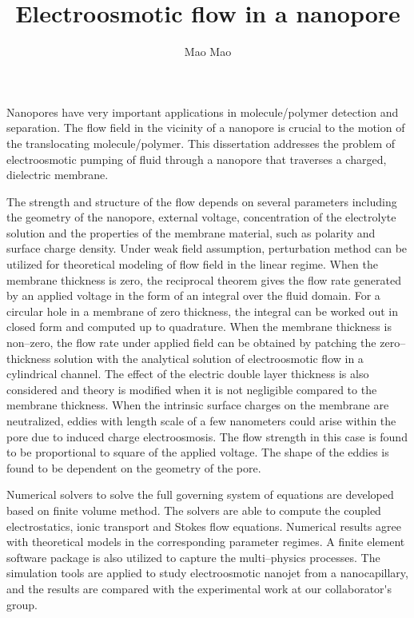 \documentclass[12pt]{nuthesis}	%
\author{Mao Mao}
\title{Electroosmotic flow in a nanopore}
\begin{document}
%	
%


\frontmatter		%

\maketitle		%

\copyrightpage		%

\abstract		%
Nanopores have very important applications in molecule\//polymer detection and separation. The flow field in the vicinity of a nanopore is crucial to the motion of the translocating molecule\//polymer. This dissertation addresses the problem of electroosmotic pumping of fluid through a nanopore that traverses a charged, dielectric membrane. 

The strength and structure of the flow depends on several parameters including the geometry of the nanopore, external voltage, concentration of the electrolyte solution and the properties of the membrane material, such as polarity and surface charge density. Under weak field assumption, perturbation method can be utilized for theoretical modeling of flow field in the linear regime. When the membrane thickness is zero, the reciprocal theorem gives the flow rate generated by an applied voltage in the form of an integral over the fluid domain. For a circular hole in a membrane of zero thickness, the integral can be worked out in closed form and computed up to quadrature. When the membrane thickness is non--zero, the flow rate under applied field can be obtained by patching the zero--thickness solution with the analytical solution of electroosmotic flow in a cylindrical channel. The effect of the electric double layer thickness is also considered and theory is modified when it is not negligible compared to the membrane thickness. When the intrinsic surface charges on the membrane are neutralized, eddies with length scale of a few nanometers could arise within the pore due to induced charge electroosmosis. The flow strength in this case is found to be proportional to square of the applied voltage. The shape of the eddies is found to be dependent on the geometry of the pore.

Numerical solvers to solve the full governing system of equations are developed based on finite volume method. The solvers are able to compute the coupled electrostatics, ionic transport and Stokes flow equations. Numerical results agree with theoretical models in the corresponding parameter regimes. A finite element software package is also utilized to capture the multi--physics processes. The simulation tools are applied to study electroosmotic nanojet from a nanocapillary, and the results are compared with the experimental work at our collaborator\'{}s group.
\end{document}
